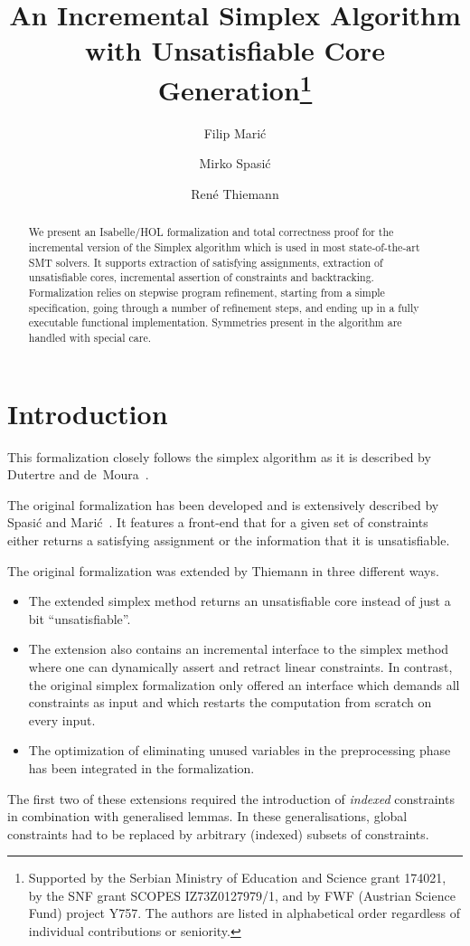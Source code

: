 \documentclass[11pt,a4paper]{article}
\begin{document}
\title{An Incremental Simplex Algorithm with Unsatisfiable Core Generation\footnote{%
Supported by the Serbian Ministry of Education and Science grant 174021, 
by the SNF grant SCOPES IZ73Z0127979/1, and
by FWF (Austrian Science Fund) project Y757.
The authors are listed in alphabetical order regardless of individual
contributions or seniority.}}
\author{Filip Mari\'c \and Mirko Spasi\'c \and Ren\'e Thiemann}

\maketitle

\begin{abstract}
We present an Isabelle/HOL formalization and total correctness
proof for the incremental version of the Simplex algorithm which is
used in most state-of-the-art SMT solvers. It supports extraction of satisfying
assignments, extraction of unsatisfiable cores, incremental assertion of constraints
and backtracking. Formalization relies on
stepwise program refinement, starting from a simple specification,
going through a number of refinement steps, and ending up in a fully
executable functional implementation. Symmetries present in the algorithm
are handled with special care. 
\end{abstract}


\tableofcontents

\section{Introduction}

This formalization closely follows the simplex algorithm as it is described by 
Dutertre and de~Moura~\cite{simplex-rad}. 

The original formalization has been developed and is extensively described 
by Spasi\'c and Mari\'c~\cite{SpasicMaric}.
It features a front-end that for a given set of constraints either returns
a satisfying assignment or the information that it is unsatisfiable.

The original formalization was extended by Thiemann in three different ways.
\begin{itemize}
\item The extended simplex method returns an unsatisfiable core instead
  of just a bit ``unsatisfiable''.
\item The extension also contains an incremental interface to the simplex
  method where one can dynamically assert and retract linear constraints.
  In contrast, the original simplex formalization only offered an 
  interface which demands all constraints as input and which restarts
  the computation from scratch on every input.
\item The optimization of eliminating unused variables in the preprocessing 
  phase~\cite[Section~3]{simplex-rad} has been integrated in the formalization.
\end{itemize}
The first two of these extensions
required the introduction of \emph{indexed} constraints in combination with
generalised lemmas. In these generalisations, global constraints had to be replaced by arbitrary (indexed) subsets of constraints. 










\end{document}
